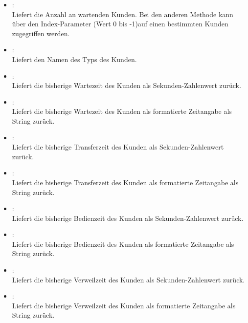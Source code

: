\begin{itemize}

\item
{}:\\
Liefert die Anzahl an wartenden Kunden. Bei den anderen Methode kann
über den Index-Parameter (Wert 0 bis -1)auf einen bestimmten
Kunden zugegriffen werden.

\item
{}:\\
Liefert den Namen des Typs des Kunden.

\item
{}:\\
Liefert die bisherige Wartezeit des Kunden als Sekunden-Zahlenwert zurück.

\item
{}:\\
Liefert die bisherige Wartezeit des Kunden als formatierte Zeitangabe als String zurück.

\item
{}:\\
Liefert die bisherige Transferzeit des Kunden als Sekunden-Zahlenwert zurück.

\item
{}:\\
Liefert die bisherige Transferzeit des Kunden als formatierte Zeitangabe als String zurück.

\item
{}:\\
Liefert die bisherige Bedienzeit des Kunden als Sekunden-Zahlenwert zurück.

\item
{}:\\
Liefert die bisherige Bedienzeit des Kunden als formatierte Zeitangabe als String zurück.

\item
{}:\\
Liefert die bisherige Verweilzeit des Kunden als Sekunden-Zahlenwert zurück.

\item
{}:\\
Liefert die bisherige Verweilzeit des Kunden als formatierte Zeitangabe als String zurück.


\end{itemize}

